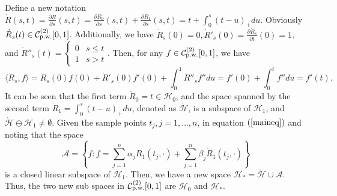 Define a new notation $\dot{R}(s,t)=\frac{\partial R}{\partial s}(s,t)=\frac{\partial R_0}{\partial s}(s,t)+\frac{\partial R_1}{\partial s}(s,t)=t+\int_0^s(t-u)_+du$. Obviously $\dot{R}_s(t) \in \mathcal{C}_{\mbox{\scriptsize p.w.}}^{(2)}[0,1]$. Additionally, we have $\dot{R}_s(0)=0, \dot{R}'_s(0)=\frac{\partial \dot{R}_s}{\partial t}(0)=1$, and $ \dot{R}''_s(t)=\begin{cases}
0 & s\leq t \\ 1 & s>t \end{cases}$. Then, for any $f\in \mathcal{C}_{\mbox{\scriptsize p.w.}}^{(2)}[0,1]$, we have 
\begin{equation*}
\langle \dot{R}_s,f\rangle =\dot{R}_s(0)f(0)+\dot{R}'_s(0)f'(0)+\int_0^1\dot{R}''_s f''	 du=f'(0)+\int_0^t f''du=f'(t).
\end{equation*}
%
It can be seen that the first term $\dot{R}_0=t\in \mathcal{H}_0$, and the space spanned by the second term $\dot{R}_1=\int_0^s(t-u)_+du$, denoted as $\mathcal{\dot{H}}$, is a subspace of $\mathcal{H}_1$, and $\mathcal{\dot{H}} \ominus \mathcal{H}_1\neq \emptyset$. Given the sample points $t_j, j=1, \ldots, n$, in equation $(\ref{maineq})$ and noting that the space
\begin{equation*}
\mathcal{A}=\left\lbrace f: f=\sum_{j=1}^{n}\alpha_jR_1(t_j,\cdot)+\sum_{j=1}^{n}\beta_j\dot{R}_1(t_j,\cdot)\right\rbrace 
\end{equation*}
is a closed linear subspace of $\mathcal{H}_1$. Then, we have a new space $\mathcal{H}_*=\mathcal{\dot{H}} \cup \mathcal{A}$. Thus, the two new sub spaces in $\mathcal{C}_{\mbox{\scriptsize p.w.}}^{(2)}[0,1]$ are $\mathcal{H}_0$ and $\mathcal{H}_*$.


